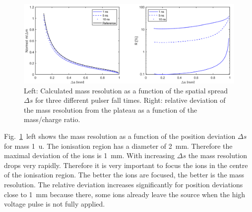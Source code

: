 	\begin{figure}[h!] %
		\centering
		\includegraphics[width=\textwidth]{Bilder/PulseSimPosition.png}
		\caption{Left: Calculated mass resolution as a function of the spatial spread $\Delta s$ for three different pulser fall times. Right: relative deviation of the mass resolution from the plateau as a function of the mass/charge ratio.}
		\label{fig:SimtfallPos}
	\end{figure}
	Fig.~\ref{fig:SimtfallPos}~left shows the mass resolution as a function of the position deviation $\Delta s$ for mass 1~u. The ionisation region has a diameter of 2~mm. Therefore the maximal deviation of the ions is 1~mm. With increasing $\Delta s$ the mass resolution drops very rapidly. Therefore it is very important to focus the ions in the centre of the ionisation region. The better the ions are focused, the better is the mass resolution. The relative deviation increases significantly for position deviations close to 1~mm because there, some ions already leave the source when the high voltage pulse is not fully applied.\\

